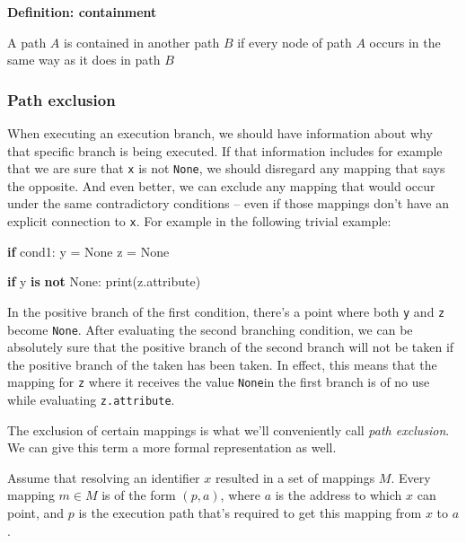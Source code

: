 \documentclass[]{article}
\newenvironment{Shaded}{}{}
\newcommand{\KeywordTok}[1]{\textcolor[rgb]{0.00,0.44,0.13}{\textbf{#1}}}
\newcommand{\VariableTok}[1]{\textcolor[rgb]{0.10,0.09,0.49}{#1}}
\newcommand{\ControlFlowTok}[1]{\textcolor[rgb]{0.00,0.44,0.13}{\textbf{#1}}}
\newcommand{\OperatorTok}[1]{\textcolor[rgb]{0.40,0.40,0.40}{#1}}
\newcommand{\BuiltInTok}[1]{#1}
\newcommand{\NormalTok}[1]{#1}
\begin{document}
\textbf{Definition: containment}

A path \(A\) is contained in another path \(B\) if every node of path
\(A\) occurs in the same way as it does in path \(B\)

\subsubsection{Path exclusion}\label{path-exclusion}

When executing an execution branch, we should have information about why
that specific branch is being executed. If that information includes for
example that we are sure that \texttt{x} is not \texttt{None}, we should
disregard any mapping that says the opposite. And even better, we can
exclude any mapping that would occur under the same contradictory
conditions -- even if those mappings don't have an explicit connection
to \texttt{x}. For example in the following trivial example:

\begin{Shaded}
\begin{Highlighting}[]
\ControlFlowTok{if}\NormalTok{ cond1:}
\NormalTok{  y }\OperatorTok{=} \VariableTok{None}
\NormalTok{  z }\OperatorTok{=} \VariableTok{None}
  
\ControlFlowTok{if}\NormalTok{ y }\KeywordTok{is} \KeywordTok{not} \VariableTok{None}\NormalTok{:}
  \BuiltInTok{print}\NormalTok{(z.attribute)}
\end{Highlighting}
\end{Shaded}

In the positive branch of the first condition, there's a point where
both \texttt{y} and \texttt{z} become \texttt{None}. After evaluating
the second branching condition, we can be absolutely sure that the
positive branch of the second branch will not be taken if the positive
branch of the taken has been taken. In effect, this means that the
mapping for \texttt{z} where it receives the value \texttt{None}in the
first branch is of no use while evaluating \texttt{z.attribute}.

The exclusion of certain mappings is what we'll conveniently call
\emph{path exclusion}. We can give this term a more formal
representation as well.

Assume that resolving an identifier \(x\) resulted in a set of mappings
\(M\). Every mapping \(m \in M\) is of the form \((p, a)\), where \(a\)
is the address to which \(x\) can point, and \(p\) is the execution path
that's required to get this mapping from \(x\) to \(a\).
\end{document}
